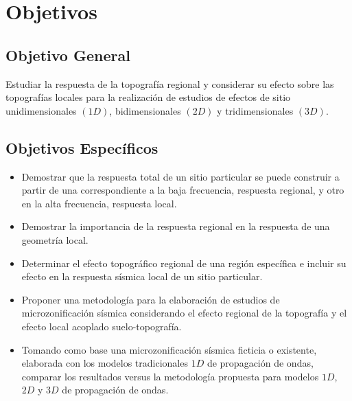 \documentclass[spanish,letterpaper,12pt,twoside,openany]{article}
\begin{document}
\section{Objetivos}
%
\subsection{Objetivo General}
%
Estudiar la respuesta de la topografía regional y considerar su efecto sobre las topografías locales para la realización de estudios de efectos de sitio unidimensionales $\left(1D\right)$, bidimensionales $\left(2D\right)$ y tridimensionales $\left(3D\right)$.
%
\subsection{Objetivos Específicos}
%
\begin{itemize}
%
	\item Demostrar que la respuesta total de un sitio particular se puede construir a partir de una correspondiente a la baja frecuencia, respuesta regional, y otro en la alta frecuencia, respuesta local.
	\item Demostrar la importancia de la respuesta regional en la respuesta de una geometría local.
	\item Determinar el efecto topográfico regional de una región específica e incluir su efecto en la respuesta sísmica local de un sitio particular.
	\item Proponer una metodología para la elaboración de estudios de microzonificación sísmica considerando el efecto regional de la topografía y el efecto local acoplado suelo-topografía.
	\item Tomando como base una microzonificación sísmica ficticia o existente, elaborada con los modelos tradicionales $1D$ de propagación de ondas, comparar los resultados versus la metodología propuesta para modelos $1D$, $2D$ y $3D$ de propagación de ondas.
%
\end{itemize}
%
%
%
%
%
\end{document}
